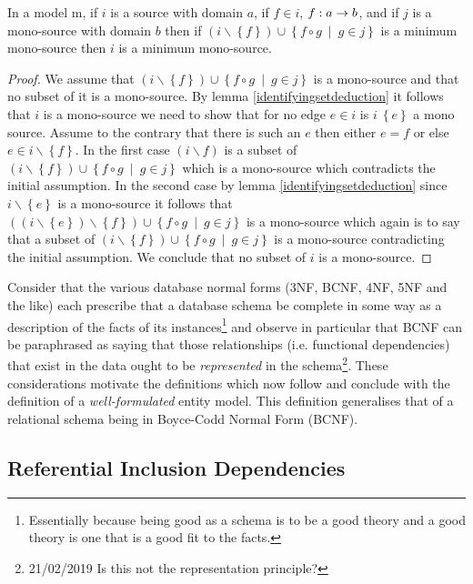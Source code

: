 \documentclass[10pt,a4paper]{article}
\newcommand{\setsuchthat}[2]{\left\{#1 \ \middle|\ #2\right\}}
\newcommand{\set}[1]{\left\{#1\right\}}
\newcommand{\genericmodel}{\mathcal{M}}
\renewcommand{\genericmodel}{{m}}
\newcommand{\term}[1]{\textit{{#1}}}
\begin{document}
\begin{lemma}
\label{identifyingfactorminimal}
In a model \genericmodel, if $i$ is a source with domain $a$,
if $f \in i$, $f: a \rightarrow b$, 
and if $j$ is a mono-source with domain $b$
then  if $(i \backslash \set{f}) \cup \setsuchthat{f \circ g}{g \in j}$ is a minimum mono-source
then $i$ is a minimum mono-source.
\end{lemma}
\begin{proof}
We assume that $(i \backslash \set{f}) \cup \setsuchthat{f \circ g}{g \in j}$ is a mono-source and that no subset of it is a mono-source.
By lemma \ref{identifyingsetdeduction} it follows that $i$ is a mono-source we need to show that
for no edge $e \in i$ is $i \ \set{e}$ a mono source. Assume to the contrary that there is such an $e$ then  either $e = f$ or else
$e \in i \backslash \set{f}$. In the first case $(i \backslash f)$ is a subset of  $(i \backslash \set{f}) \cup \setsuchthat{f \circ g}{g \in j}$ which is a mono-source which contradicts the initial assumption. In the second  case 
by lemma \ref{identifyingsetdeduction} since $i \backslash \set{e}$ is a mono-source it follows that
$((i \backslash \set{e})\backslash \set{f}) \cup \setsuchthat{f \circ g}{g \in j}$ is a mono-source which again is to say that a subset
of $(i \backslash \set{f}) \cup \setsuchthat{f \circ g}{g \in j}$ is a mono-source contradicting the initial assumption.
We conclude that no subset of $i$ is a mono-source.
\end{proof}

\newpage

\noindent
Consider that the various database normal forms (3NF, BCNF, 4NF, 5NF and the like) each 
prescribe that a database schema be complete in some way as a description of the facts of its instances\footnote{Essentially
 because being good as a schema is to be a good theory and a good theory is one that is a good fit to the facts.} and observe 
in particular that BCNF can be paraphrased as saying that those relationships (i.e. functional dependencies) that exist in the data ought to be \term{represented} in the schema\footnote{21/02/2019 Is this not the representation principle?}. These considerations motivate the definitions which now follow and conclude with the definition of a \term{well-formulated} entity model. This definition generalises that of a relational schema being in Boyce-Codd Normal Form (BCNF). 

\newpage
\subsection{Referential Inclusion Dependencies}
\end{document}

